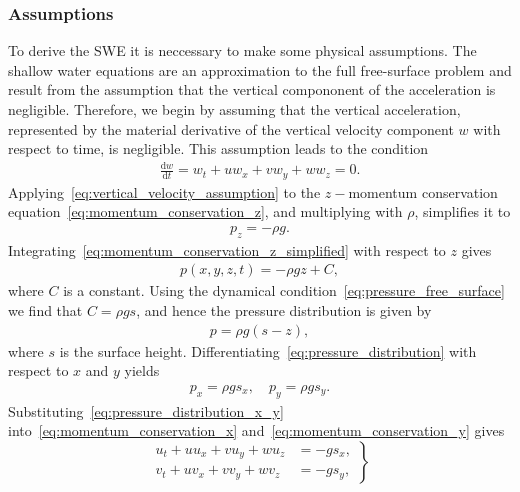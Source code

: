 \subsubsection*{Assumptions}
To derive the SWE it is neccessary to make some physical assumptions. 
The shallow water equations are an approximation to the full free-surface problem and result from the assumption that the vertical compononent of the acceleration is negligible.
Therefore, we begin by assuming that the vertical acceleration, represented by the material derivative of the vertical velocity component $w$ with respect to time, is negligible.
This assumption leads to the condition
\begin{align}\label{eq:vertical_velocity_assumption}
    \frac{\text{d} w}{\text{d} t} = w_t + uw_x + vw_y + ww_z = 0.
\end{align}
Applying~\eqref{eq:vertical_velocity_assumption} to the $z-$momentum conservation equation~\eqref{eq:momentum_conservation_z}, and multiplying with $\rho$, simplifies it to
\begin{align}\label{eq:momentum_conservation_z_simplified}
    p_z = -\rho g.
\end{align}
Integrating~\eqref{eq:momentum_conservation_z_simplified} with respect to $z$ gives
\begin{align*}
    p(x, y, z, t) = - \rho g z + C,
\end{align*}
where $C$ is a constant.
Using the dynamical condition~\eqref{eq:pressure_free_surface} we find that $C = \rho g s$, and hence the pressure distribution is given by
\begin{align}\label{eq:pressure_distribution}
    p =  \rho g (s - z),
\end{align}
where $s$ is the surface height.
Differentiating~\eqref{eq:pressure_distribution} with respect to $x$ and $y$ yields
\begin{align}\label{eq:pressure_distribution_x_y}
    p_x = \rho g s_x, \quad p_y = \rho g s_y.
\end{align}
Substituting~\eqref{eq:pressure_distribution_x_y} into~\eqref{eq:momentum_conservation_x} and~\eqref{eq:momentum_conservation_y} gives
\begin{equation}\label{eq:momentum_conservation_xy_simplified}
    \left.
    \begin{aligned}
        u_t + u u_x + v u_y + w u_z &= -g s_x,  \\
        v_t + u v_x + v v_y + w v_z &= -g s_y,
    \end{aligned}
    \right\}
\end{equation}
